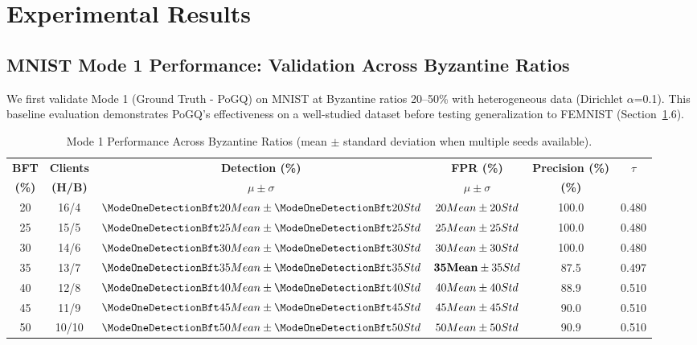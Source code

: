 \section{Experimental Results}
\label{sec:results}



\subsection{MNIST Mode 1 Performance: Validation Across Byzantine Ratios}

We first validate Mode 1 (Ground Truth - PoGQ) on MNIST at Byzantine ratios 20--50\% with heterogeneous data (Dirichlet $\alpha$=0.1). This baseline evaluation demonstrates PoGQ's effectiveness on a well-studied dataset before testing generalization to FEMNIST (Section~\ref{sec:results}.6).

\begin{table}[h]
\centering
\caption{Mode 1 Performance Across Byzantine Ratios (mean $\pm$ standard deviation when multiple seeds available).}
\label{tab:mode1_performance}
\begin{tabular}{@{}cccccc@{}}
\toprule
\textbf{BFT} & \textbf{Clients} & \textbf{Detection (\%)} & \textbf{FPR (\%)} & \textbf{Precision (\%)} & \textbf{$\tau$} \\
\textbf{(\%)} & \textbf{(H/B)} & \textbf{$\mu \pm \sigma$} & \textbf{$\mu \pm \sigma$} & \textbf{(\%)} & \\
\midrule
20 & 16/4 & $\ModeOneDetectionBft20Mean \pm \ModeOneDetectionBft20Std$ & $\ModeOneFprBft20Mean \pm \ModeOneFprBft20Std$ & 100.0 & 0.480 \\
25 & 15/5 & $\ModeOneDetectionBft25Mean \pm \ModeOneDetectionBft25Std$ & $\ModeOneFprBft25Mean \pm \ModeOneFprBft25Std$ & 100.0 & 0.480 \\
30 & 14/6 & $\ModeOneDetectionBft30Mean \pm \ModeOneDetectionBft30Std$ & $\ModeOneFprBft30Mean \pm \ModeOneFprBft30Std$ & 100.0 & 0.480 \\
35 & 13/7 & $\ModeOneDetectionBft35Mean \pm \ModeOneDetectionBft35Std$ & $\mathbf{\ModeOneFprBft35Mean} \pm \ModeOneFprBft35Std$ & 87.5 & 0.497 \\
40 & 12/8 & $\ModeOneDetectionBft40Mean \pm \ModeOneDetectionBft40Std$ & $\ModeOneFprBft40Mean \pm \ModeOneFprBft40Std$ & 88.9 & 0.510 \\
45 & 11/9 & $\ModeOneDetectionBft45Mean \pm \ModeOneDetectionBft45Std$ & $\ModeOneFprBft45Mean \pm \ModeOneFprBft45Std$ & 90.0 & 0.510 \\
50 & 10/10 & $\ModeOneDetectionBft50Mean \pm \ModeOneDetectionBft50Std$ & $\ModeOneFprBft50Mean \pm \ModeOneFprBft50Std$ & 90.9 & 0.510 \\
\bottomrule
\end{tabular}
\end{table}

